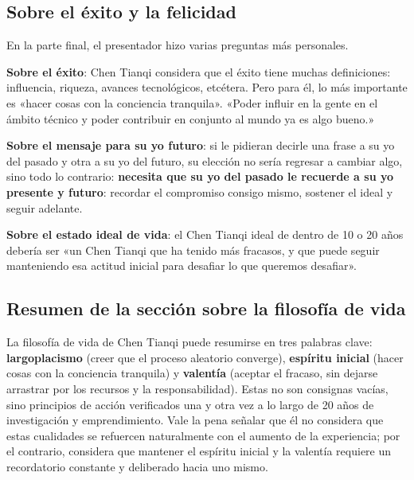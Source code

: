 \subsection{Sobre el éxito y la felicidad}

En la parte final, el presentador hizo varias preguntas más personales.

\textbf{Sobre el éxito}: Chen Tianqi considera que el éxito tiene muchas definiciones: influencia, riqueza, avances tecnológicos, etcétera. Pero para él, lo más importante es «hacer cosas con la conciencia tranquila». «Poder influir en la gente en el ámbito técnico y poder contribuir en conjunto al mundo ya es algo bueno.»

\textbf{Sobre el mensaje para su yo futuro}: si le pidieran decirle una frase a su yo del pasado y otra a su yo del futuro, su elección no sería regresar a cambiar algo, sino todo lo contrario: \textbf{necesita que su yo del pasado le recuerde a su yo presente y futuro}: recordar el compromiso consigo mismo, sostener el ideal y seguir adelante.

\textbf{Sobre el estado ideal de vida}: el Chen Tianqi ideal de dentro de 10 o 20 años debería ser «un Chen Tianqi que ha tenido más fracasos, y que puede seguir manteniendo esa actitud inicial para desafiar lo que queremos desafiar».

\subsection{Resumen de la sección sobre la filosofía de vida}

La filosofía de vida de Chen Tianqi puede resumirse en tres palabras clave: \textbf{largoplacismo} (creer que el proceso aleatorio converge), \textbf{espíritu inicial} (hacer cosas con la conciencia tranquila) y \textbf{valentía} (aceptar el fracaso, sin dejarse arrastrar por los recursos y la responsabilidad). Estas no son consignas vacías, sino principios de acción verificados una y otra vez a lo largo de 20 años de investigación y emprendimiento. Vale la pena señalar que él no considera que estas cualidades se refuercen naturalmente con el aumento de la experiencia; por el contrario, considera que mantener el espíritu inicial y la valentía requiere un recordatorio constante y deliberado hacia uno mismo.
